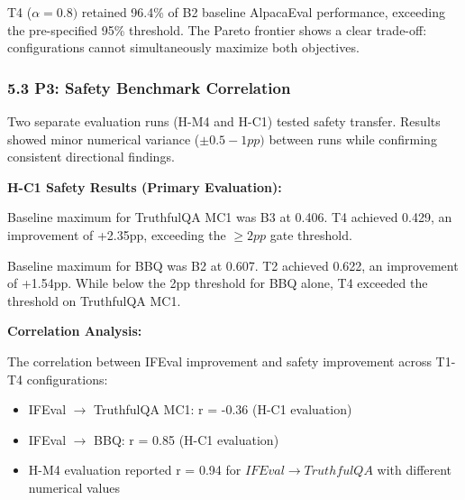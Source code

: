 T4 ($\alpha =0.8)$ retained 96.4\% of B2 baseline AlpacaEval performance, exceeding the pre-specified 95\% threshold. The Pareto frontier shows a clear trade-off: configurations cannot simultaneously maximize both objectives.

\subsubsection{5.3 P3: Safety Benchmark Correlation}

Two separate evaluation runs (H-M4 and H-C1) tested safety transfer. Results showed minor numerical variance ($\pm 0.5-1pp)$ between runs while confirming consistent directional findings.

\textbf{H-C1 Safety Results (Primary Evaluation):}

\begin{table}[htbp]
\centering
{}
\end{table}

Baseline maximum for TruthfulQA MC1 was B3 at 0.406. T4 achieved 0.429, an improvement of +2.35pp, exceeding the $\geq 2pp$ gate threshold.

Baseline maximum for BBQ was B2 at 0.607. T2 achieved 0.622, an improvement of +1.54pp. While below the 2pp threshold for BBQ alone, T4 exceeded the threshold on TruthfulQA MC1.

\textbf{Correlation Analysis:}

The correlation between IFEval improvement and safety improvement across T1-T4 configurations:
\begin{itemize}
\item IFEval $\rightarrow$ TruthfulQA MC1: r = -0.36 (H-C1 evaluation)
\item IFEval $\rightarrow$ BBQ: r = 0.85 (H-C1 evaluation)
\item H-M4 evaluation reported r = 0.94 for $IFEval\rightarrow TruthfulQA$ with different numerical values
\end{itemize}

